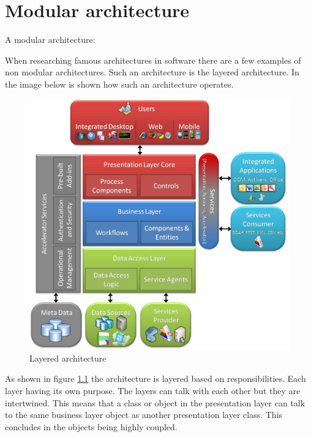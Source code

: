 \chapter{Modular architecture}
\label{sec:ModularArchitecture}

A modular architecture:

When researching famous architectures in software there are a few examples of non modular architectures. Such an architecture is the layered architecture. In the image below is shown how such an architecture operates.

\begin{figure}[H]
	\includegraphics[width=\linewidth]{layered_architecture.png}
        \caption{Layered architecture \cite{layeredArchitecture}}
        \label{fig:LayeredArchitecture}
\end{figure}

As shown in figure \ref{fig:LayeredArchitecture} the architecture is layered based on responsibilities. Each layer having its own purpose. The layers can talk with each other but they are intertwined. This means that a class or object in the presentation layer can talk to the same business layer object as another presentation layer class. This concludes in the objects being highly coupled.

